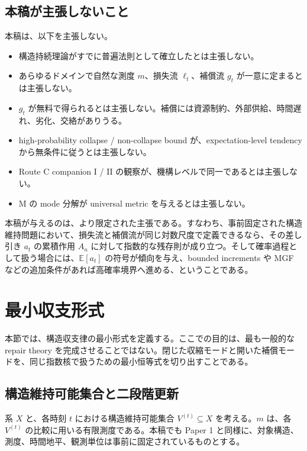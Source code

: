 \documentclass[12pt,a4paper]{article}
\begin{document}
\subsection{本稿が主張しないこと}\label{ux672cux7a3fux304cux4e3bux5f35ux3057ux306aux3044ux3053ux3068}

本稿は、以下を主張しない。

\begin{itemize}
\tightlist
\item
  構造持続理論がすでに普遍法則として確立したとは主張しない。
\item
  あらゆるドメインで自然な測度 \(m\)、損失流 \(\ell_{t}\)、補償流 \(g_{t}\) が一意に定まるとは主張しない。
\item
  \(g_{t}\) が無料で得られるとは主張しない。補償には資源制約、外部供給、時間遅れ、劣化、交絡がありうる。
\item
  high-probability collapse / non-collapse bound が、expectation-level tendency から無条件に従うとは主張しない。
\item
  Route C companion I / II の観察が、機構レベルで同一であるとは主張しない。
\item
  M の mode 分解が universal metric を与えるとは主張しない。
\end{itemize}

本稿が与えるのは、より限定された主張である。すなわち、事前固定された構造維持問題において、損失流と補償流が同じ対数尺度で定義できるなら、その差し引き \(a_{t}\) の累積作用 \(A_{n}\) に対して指数的な残存則が成り立つ。そして確率過程として扱う場合には、\(\mathbb E[a_{t}]\) の符号が傾向を与え、bounded increments や MGF などの追加条件があれば高確率境界へ進める、ということである。

\section{最小収支形式}\label{ux6700ux5c0fux53ceux652fux5f62ux5f0f}

本節では、構造収支律の最小形式を定義する。ここでの目的は、最も一般的な repair theory を完成させることではない。閉じた収縮モードと開いた補償モードを、同じ指数核で扱うための最小恒等式を切り出すことである。

\subsection{構造維持可能集合と二段階更新}\label{ux69cbux9020ux7dadux6301ux53efux80fdux96c6ux5408ux3068ux4e8cux6bb5ux968eux66f4ux65b0}

系 \(X\) と、各時刻 \(t\) における構造維持可能集合 \(V^{(t)}\subseteq X\) を考える。\(m\) は、各 \(V^{(t)}\) の比較に用いる有限測度である。本稿でも Paper 1 と同様に、対象構造、測度、時間地平、観測単位は事前に固定されているものとする。
\end{document}
